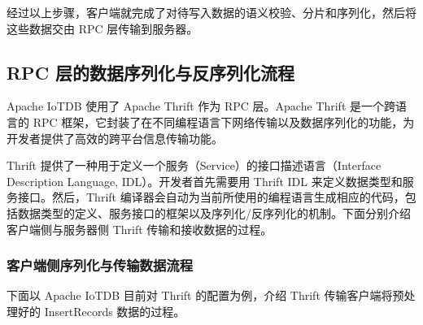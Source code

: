 经过以上步骤，客户端就完成了对待写入数据的语义校验、分片和序列化，然后将这些数据交由 RPC 层传输到服务器。
\subsection{RPC 层的数据序列化与反序列化流程}
Apache IoTDB 使用了 Apache Thrift\cite{apache2024thrift} 作为 RPC 层。Apache Thrift 是一个跨语言的 RPC 框架，它封装了在不同编程语言下网络传输以及数据序列化的功能，为开发者提供了高效的跨平台信息传输功能。

Thrift 提供了一种用于定义一个服务（Service）的接口描述语言（Interface Description Language, IDL）。开发者首先需要用 Thrift IDL 来定义数据类型和服务接口。然后，Thrift 编译器会自动为当前所使用的编程语言生成相应的代码，包括数据类型的定义、服务接口的框架以及序列化/反序列化的机制。下面分别介绍客户端侧与服务器侧 Thrift 传输和接收数据的过程。
\subsubsection{客户端侧序列化与传输数据流程\label{sec:chap3-sec2-2-1}}
下面以 Apache IoTDB 目前对 Thrift 的配置为例，介绍 Thrift 传输客户端将预处理好的 InsertRecords 数据的过程。

